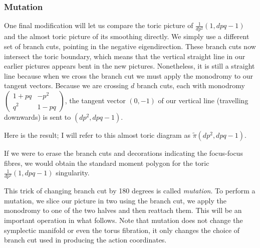 \documentclass{article}
\begin{document}
\subsubsection{Mutation}


One final modification will let us compare the toric picture of
\(\frac{1}{dp^2}(1,dpq-1)\) and the almost toric picture of its
smoothing directly. We simply use a different set of branch cuts,
pointing in the negative eigendirection. These branch cuts now
intersect the toric boundary, which means that the vertical straight
line in our earlier pictures appears bent in the new
pictures. Nonetheless, it is still a straight line because when we
cross the branch cut we must apply the monodromy to our tangent
vectors. Because we are crossing \(d\) branch cuts, each with
monodromy \(\begin{pmatrix} 1+pq & -p^2 \\ q^2 & 1-pq\end{pmatrix}\),
the tangent vector \((0,-1)\) of our vertical line (travelling
downwards) is sent to \((dp^2,dpq-1)\).


Here is the result; I will refer to this almost toric diagram as
\(\tilde{\pi}(dp^2,dpq-1)\).


\begin{center}
\end{center}
If we were to erase the branch cuts and decorations indicating the
focus-focus fibres, we would obtain the standard moment polygon for
the toric \(\frac{1}{dp^2}(1,dpq-1)\) singularity.


\begin{Remark}
This trick of changing branch cut by 180 degrees is called {\em
mutation}. To perform a mutation, we slice our picture in two using
the branch cut, we apply the monodromy to one of the two halves and
then reattach them. This will be an important operation in what
follows. Note that mutation does not change the symplectic manifold
or even the torus fibration, it only changes the choice of branch
cut used in producing the action coordinates.


\end{Remark}
\end{document}
